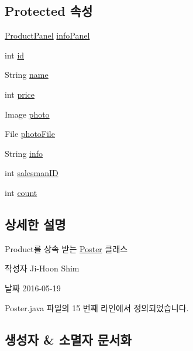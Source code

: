 \subsection*{Protected 속성}
\begin{DoxyCompactItemize}
\item 
\hyperlink{classpkg_1_1_product_panel}{Product\+Panel} \hyperlink{classpkg_1_1_product_a6755de182d9383bc860fa44a8a01789d}{info\+Panel}
\item 
int \hyperlink{classpkg_1_1_product_ac7846687b2d11faba3be1395fcbbab72}{id}
\item 
String \hyperlink{classpkg_1_1_product_acdadb9558664acdfd23eff5b2b77ae90}{name}
\item 
int \hyperlink{classpkg_1_1_product_a46c6eb6906d4ee2f6393515f41dba7c9}{price}
\item 
Image \hyperlink{classpkg_1_1_product_a5d279eb4556860b90305cc26a3ee69be}{photo}
\item 
File \hyperlink{classpkg_1_1_product_a2eeaba74c302ecdc9dd288ff7527ac67}{photo\+File}
\item 
String \hyperlink{classpkg_1_1_product_ade3d909a0e7d15ec98c2f27eecd637cd}{info}
\item 
int \hyperlink{classpkg_1_1_product_aecf411b201022fca17571e9afbc76747}{salesman\+ID}
\item 
int \hyperlink{classpkg_1_1_product_ac136af1e8637edc22218dd9c3383266b}{count}
\end{DoxyCompactItemize}


\subsection{상세한 설명}
Product를 상속 받는 \hyperlink{classpkg_1_1_poster}{Poster} 클래스 

\begin{DoxyAuthor}{작성자}
Ji-\/\+Hoon Shim 
\end{DoxyAuthor}
\begin{DoxyDate}{날짜}
2016-\/05-\/19 
\end{DoxyDate}


Poster.\+java 파일의 15 번째 라인에서 정의되었습니다.



\subsection{생성자 \& 소멸자 문서화}
